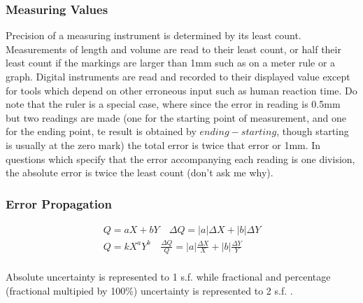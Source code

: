 \documentclass[../main]{subfiles}
\begin{document}



	\subsubsection{Measuring Values}

	Precision of a measuring instrument is determined by its least count. Measurements of length and volume are read to their least count, or half their least count if the markings are larger than 1mm such as on a meter rule or a graph. Digital instruments are read and recorded to their displayed value except for tools which depend on other erroneous input such as human reaction time. Do note that the ruler is a special case, where since the error in reading is 0.5mm but two readings are made (one for the starting point of measurement, and one for the ending point, te result is obtained by \(ending-starting\), though starting is usually at the zero mark) the total error is twice that error or 1mm. In questions which specify that the error accompanying each reading is one division, the absolute error is twice the least count (don't ask me why).

	\subsubsection{Error Propagation}

	\begin{equation*} \begin{gathered}
		Q = aX + bY \quad \Delta Q = |a| \Delta X + |b| \Delta Y \\
		Q = k  X^a Y^b \quad \frac{\Delta Q}{Q} = |a|\frac{\Delta X}{X} + |b| \frac{\Delta Y}{Y} \\
	\end{gathered} \end{equation*}

	Absolute uncertainty is represented to 1 s.f. while fractional and percentage (fractional multipied by 100\%) uncertainty is represented to 2 s.f. . \\
\end{document}
